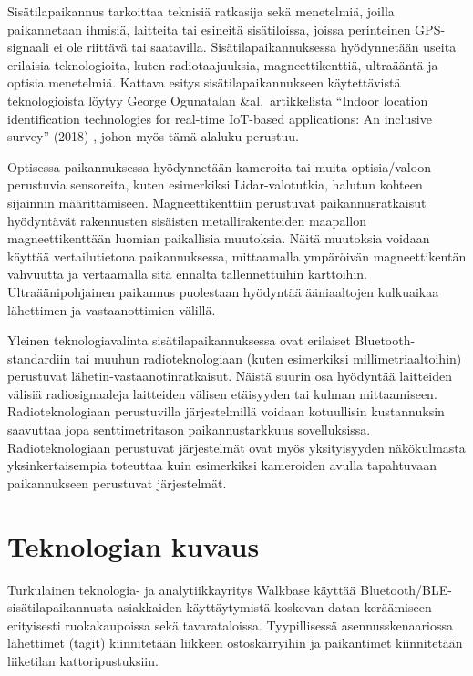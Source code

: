 \documentclass[
  12pt,
  a4paper, twoside]{book}
\begin{document}
Sisätilapaikannus tarkoittaa teknisiä ratkasija sekä menetelmiä, joilla paikannetaan ihmisiä, laitteita tai esineitä sisätiloissa, joissa perinteinen GPS-signaali ei ole riittävä tai saatavilla. Sisätilapaikannuksessa hyödynnetään useita erilaisia teknologioita, kuten radiotaajuuksia, magneettikenttiä, ultraääntä ja optisia menetelmiä. Kattava esitys sisätilapaikannukseen käytettävistä teknologioista löytyy George Ogunatalan \&al.~artikkelista ``Indoor location identification technologies for real-time IoT-based applications: An inclusive survey'' (2018) \citep{oguntala-2018}, johon myös tämä alaluku perustuu.

Optisessa paikannuksessa hyödynnetään kameroita tai muita optisia/valoon perustuvia sensoreita, kuten esimerkiksi Lidar-valotutkia, halutun kohteen sijainnin määrittämiseen. Magneettikenttiin perustuvat paikannusratkaisut hyödyntävät rakennusten sisäisten metallirakenteiden maapallon magneettikenttään luomian paikallisia muutoksia. Näitä muutoksia voidaan käyttää vertailutietona paikannuksessa, mittaamalla ympäröivän magneettikentän vahvuutta ja vertaamalla sitä ennalta tallennettuihin karttoihin. Ultraäänipohjainen paikannus puolestaan hyödyntää ääniaaltojen kulkuaikaa lähettimen ja vastaanottimien välillä.

Yleinen teknologiavalinta sisätilapaikannuksessa ovat erilaiset Bluetooth-standardiin tai muuhun radioteknologiaan (kuten esimerkiksi millimetriaaltoihin) perustuvat lähetin-vastaanotinratkaisut. Näistä suurin osa hyödyntää laitteiden välisiä radiosignaaleja laitteiden välisen etäisyyden tai kulman mittaamiseen. Radioteknologiaan perustuvilla järjestelmillä voidaan kotuullisin kustannuksin saavuttaa jopa senttimetritason paikannustarkkuus sovelluksissa. Radioteknologiaan perustuvat järjestelmät ovat myös yksityisyyden näkökulmasta yksinkertaisempia toteuttaa kuin esimerkiksi kameroiden avulla tapahtuvaan paikannukseen perustuvat järjestelmät.

\section{Teknologian kuvaus}

Turkulainen teknologia- ja analytiikkayritys Walkbase käyttää Bluetooth/BLE-sisätilapaikannusta asiakkaiden käyttäytymistä koskevan datan keräämiseen erityisesti ruokakaupoissa sekä tavarataloissa. Tyypillisessä asennusskenaariossa lähettimet (tagit) kiinnitetään liikkeen ostoskärryihin ja paikantimet kiinnitetään liiketilan kattoripustuksiin.
\end{document}
